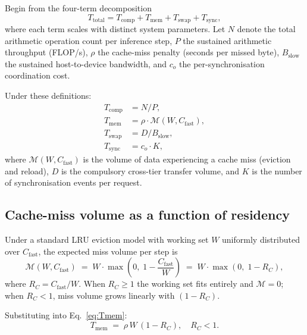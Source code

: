 Begin from the four-term decomposition
\begin{equation}
T_{\mathrm{total}} = T_{\mathrm{comp}} + T_{\mathrm{mem}} + T_{\mathrm{swap}} + T_{\mathrm{sync}},
\label{eq:app_decomp}
\end{equation}
where each term scales with distinct system parameters.
Let $N$ denote the total arithmetic operation count per inference step,
$P$ the sustained arithmetic throughput (FLOP/s), $\rho$ the cache-miss
penalty (seconds per missed byte), $B_{\mathrm{slow}}$ the sustained
host-to-device bandwidth, and $c_o$ the per-synchronisation
coordination cost.

Under these definitions:
\begin{align}
T_{\mathrm{comp}}  &= N / P,                          \label{eq:Tcomp}  \\
T_{\mathrm{mem}}   &= \rho \cdot \mathcal{M}(W, C_{\mathrm{fast}}),   \label{eq:Tmem}  \\
T_{\mathrm{swap}}  &= D / B_{\mathrm{slow}},                         \label{eq:Tswap} \\
T_{\mathrm{sync}}  &= c_o \cdot K,                     \label{eq:Tsync}
\end{align}
where $\mathcal{M}(W, C_{\mathrm{fast}})$ is the volume of data experiencing a
cache miss (eviction and reload), $D$ is the compulsory cross-tier transfer
volume, and $K$ is the number of synchronisation events per request.

\subsection{Cache-miss volume as a function of residency}
\label{app:miss}

Under a standard LRU eviction model with working set $W$ uniformly distributed
over $C_{\mathrm{fast}}$, the expected miss volume per step
is~\cite{mattson1970evaluation}
\begin{equation}
\mathcal{M}(W, C_{\mathrm{fast}}) \;=\; W \cdot \max\!\left(0,\;
  1 - \frac{C_{\mathrm{fast}}}{W}\right)
\;=\; W \cdot \max(0,\; 1 - R_C),
\label{eq:miss_volume}
\end{equation}
where $R_C = C_{\mathrm{fast}} / W$.
When $R_C \geq 1$ the working set fits entirely and $\mathcal{M} = 0$; when
$R_C < 1$, miss volume grows linearly with $(1-R_C)$.

Substituting into Eq.~\eqref{eq:Tmem}:
\begin{equation}
T_{\mathrm{mem}} \;=\; \rho \, W \, (1 - R_C), \quad R_C < 1.
\label{eq:Tmem_rc}
\end{equation}

